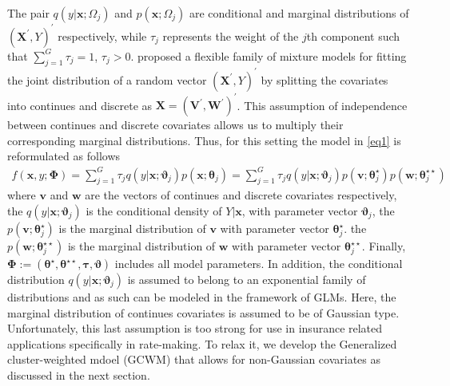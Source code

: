 \documentclass[11pt,letterpaper]{article}
\numberwithin{equation}{section}
\numberwithin{equation}{section}
\numberwithin{equation}{section}
\begin{document}
The pair $q(y|\bm{x};\Omega_j)$ and $p(\bm{x};\Omega_j)$ are conditional and marginal distributions of $(\bm{X^{'}}, Y)^{'}$ respectively, while $\tau_j$ represents the weight of the $j$th component such that $\sum_{j=1}^{G}\tau_j=1$, $\tau_j>0$.
\cite{Ingrassia+Punzo+Vittadini+Minotti:2015} proposed a flexible family of mixture models for fitting the joint distribution of a random vector $(\bm{X^{'}}, Y)^{'}$ by splitting the covariates into continues and discrete as $ \bm{X}=(\bm{V^{'}},  \bm{W^{'}})^{'}$. This assumption of independence between continues and discrete covariates allows us to multiply their corresponding marginal distributions. Thus, for this setting the model in \eqref{eq1} is reformulated as follows
\begin{align}
 f(\bm{x}, y; \bm{\Phi})= \sum_{j=1}^{G} \tau_j q(y|\bm{x};\bm{\vartheta}_j)p(\bm{x};\bm{\theta}_j)=\sum_{j=1}^{G} \tau_j q(y|\bm{x};\bm{\vartheta}_j)p(\bm{v}; \bm{\theta}_j^{\star})p(\bm{w};\bm{\theta}_j^{\star\star})
\label{eq2}
\end{align}
where $\bm{v}$ and $\bm{w}$ are the vectors of continues and discrete covariates respectively, the $q(y|\bm{x};\bm{\vartheta}_j)$ is the conditional density of $Y|\bm{x}$, with parameter vector $\bm{\vartheta}_j$, the $p(\bm{v};\bm{\theta}_j^{\star})$ is the marginal distribution of $\bm{v}$ with parameter vector $\bm{\theta}_j^{\star}$. the $p(\bm{w};\bm{\theta}_j^{\star\star})$ is the marginal distribution of $\bm{w}$ with parameter vector $\bm{\theta}_j^{\star\star}$. Finally, $\bm{\Phi}:=(\bm{\theta}^{\star},\bm{\theta}^{\star\star}, \bm{\tau}, \bm{\vartheta})$ includes all model parameters. %
In addition, the conditional distribution $q(y|\bm{x};\bm{\vartheta}_j)$ is assumed to belong to an exponential family of distributions and as such can be modeled in the framework of GLMs. Here, the marginal distribution of continues covariates is assumed to be of Gaussian type. Unfortunately, this last assumption is too strong for use in insurance related applications specifically in rate-making. To relax it, we develop the Generalized cluster-weighted mdoel (GCWM) that allows for non-Gaussian covariates as discussed in the next section.
\end{document}
